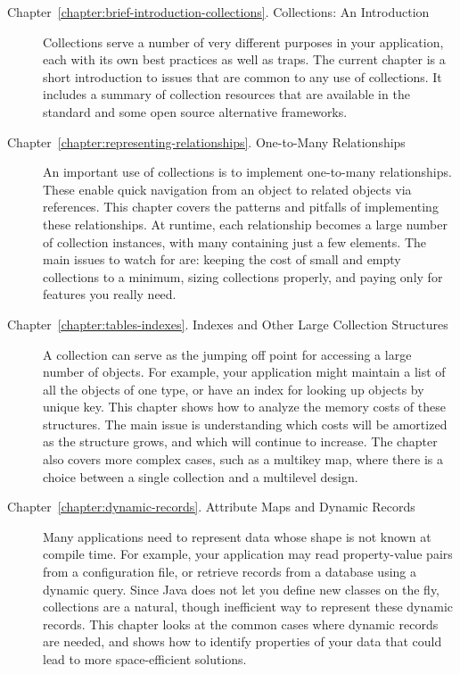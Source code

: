 \begin{description}
\item[Chapter~\ref{chapter:brief-introduction-collections}.  Collections: An
Introduction]
Collections serve a number of very
different purposes in your application, each with its own best practices as well
as traps. The current chapter
is a short introduction to issues that are common to
any use of collections. It includes a summary of collection resources
that are available in the standard and some open source alternative
frameworks.
\item[Chapter~\ref{chapter:representing-relationships}.
One-to-Many Relationships] An important use of collections is to
implement one-to-many relationships. These enable quick navigation from an
object to related objects via references. This chapter covers the patterns and pitfalls of
implementing these relationships. At runtime, each relationship
becomes a large number of collection instances, with many containing just a few elements.
The main issues to watch for
are: keeping the cost of small and empty collections to a minimum, sizing
collections properly, and paying only for features you really need.

\item[Chapter~\ref{chapter:tables-indexes}. Indexes and Other Large Collection
Structures] A collection can serve as the jumping off
point for accessing a large number of objects. For example, your application
might maintain a list of all the objects of one type, or have an index for
looking up objects by unique key. This chapter shows how to analyze the memory
costs of these structures. The main
issue is understanding which costs will be amortized as the structure grows, and
which will continue to increase. The chapter also covers more complex cases,
such as a multikey map, where there is a choice between a single collection and a multilevel design.

\item[Chapter~\ref{chapter:dynamic-records}. Attribute Maps and Dynamic
Records] Many applications need to represent data whose shape is not
known at compile time. For example, your application may read property-value
pairs from a configuration file, or retrieve records from a database
using a dynamic query. Since Java does not let you define new classes on the
fly, collections are a natural, though inefficient way to represent
these dynamic records. This chapter looks at the common cases where dynamic records
are needed, and shows how to identify properties of your data that could lead to
more space-efficient solutions.


\end{description}
